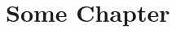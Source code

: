 \documentclass[11pt, b5paper, oneside]{book}
\author{}
\title{}
\date{}
\begin{document}
    \maketitle
    \newpage
    \tableofcontents
    \newpage
    \chapter{Some Chapter}\label{ch:some-chapter}
    \lipsum*[20]
    \newpage
    \lipsum*[20]
\end{document}
